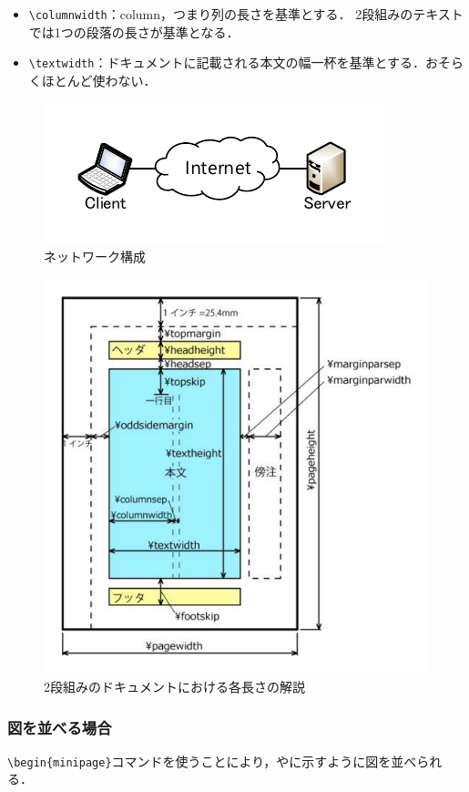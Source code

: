 \documentclass[uplatex]{jsarticle}
\begin{document}
\begin{itemize}
	\item \verb|\columnwidth|：column，つまり列の長さを基準とする．
	2段組みのテキストでは1つの段落の長さが基準となる．
	\item \verb|\textwidth|：ドキュメントに記載される本文の幅一杯を基準とする．おそらくほとんど使わない．
\end{itemize}



\begin{figure}[ht]
	\begin{center}
		\includegraphics[width=0.4 \columnwidth]{fig/figure1.pdf}
		\caption{ネットワーク構成}
		\label{fig:NetConf}
	\end{center}
\end{figure}


\begin{figure}[ht]
	\begin{center}
		\includegraphics[width=0.51 \columnwidth]{fig/tex-margin.pdf}
		\caption{2段組みのドキュメントにおける各長さの解説}
		\label{fig:tex-margin}
	\end{center}
\end{figure}



\subsubsection{図を並べる場合}
\verb|\begin{minipage}|コマンドを使うことにより，やに示すように図を並べられる．
\end{document}
